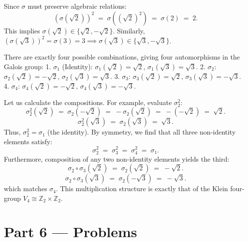 \documentclass[12pt, a4paper]{article}
\begin{document}
\begin{enumerate}[label=\textbf{E\arabic*.}]
        Since $\sigma$ must preserve algebraic relations:
        \[
          (\sigma(\sqrt{2}))^2 \;=\; \sigma((\sqrt{2})^2) \;=\; \sigma(2) \;=\; 2.
        \]
        This implies $\sigma(\sqrt{2}) \in \{\sqrt{2}, -\sqrt{2}\}$.
        Similarly, $(\sigma(\sqrt{3}))^2 = \sigma(3) = 3 \implies \sigma(\sqrt{3}) \in \{\sqrt{3}, -\sqrt{3}\}$.
        
        There are exactly four possible combinations, giving four automorphisms in the Galois group:
        1. $\sigma_1$ (Identity): $\sigma_1(\sqrt{2}) = \sqrt{2}$, $\sigma_1(\sqrt{3}) = \sqrt{3}$.
        2. $\sigma_2$: $\sigma_2(\sqrt{2}) = -\sqrt{2}$, $\sigma_2(\sqrt{3}) = \sqrt{3}$.
        3. $\sigma_3$: $\sigma_3(\sqrt{2}) = \sqrt{2}$, $\sigma_3(\sqrt{3}) = -\sqrt{3}$.
        4. $\sigma_4$: $\sigma_4(\sqrt{2}) = -\sqrt{2}$, $\sigma_4(\sqrt{3}) = -\sqrt{3}$.
        
        Let us calculate the compositions. For example, evaluate $\sigma_2^2$:
        \[
          \sigma_2^2(\sqrt{2}) \;=\; \sigma_2(-\sqrt{2}) \;=\; -\sigma_2(\sqrt{2}) \;=\; -(-\sqrt{2}) \;=\; \sqrt{2}.
        \]
        \[
          \sigma_2^2(\sqrt{3}) \;=\; \sigma_2(\sqrt{3}) \;=\; \sqrt{3}.
        \]
        Thus, $\sigma_2^2 = \sigma_1$ (the identity).
        By symmetry, we find that all three non-identity elements satisfy:
        \[
          \sigma_2^2 \;=\; \sigma_3^2 \;=\; \sigma_4^2 \;=\; \sigma_1.
        \]
        Furthermore, composition of any two non-identity elements yields the third:
        \[
          \sigma_2 \circ \sigma_3(\sqrt{2}) \;=\; \sigma_2(\sqrt{2}) \;=\; -\sqrt{2}.
        \]
        \[
          \sigma_2 \circ \sigma_3(\sqrt{3}) \;=\; \sigma_2(-\sqrt{3}) \;=\; -\sqrt{3}.
        \]
        which matches $\sigma_4$.
        This multiplication structure is exactly that of the Klein four-group $V_4 \cong \mathbb{Z}_2 \times \mathbb{Z}_2$.
\end{enumerate}

\newpage

\section{Part 6 --- Problems}
\end{document}
